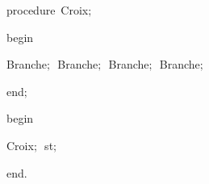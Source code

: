 {\pagebreak[3] 
\vspace{\neglskip}\mbox{\blc  \blk\idt  \mcl procedure\idt \ Croix$;$}\par 
\vspace{\neglskip}\mbox{\blc  \blk\idt  \mcl begin\idt }\par 
\vspace{\neglskip}\mbox{\blc  \blk\blk\idt  Branche$;$\ Branche$;$\ Branche$;$\ Branche$;$\ }\par 
\vspace{\neglskip}\mbox{\blc  \blk\idt  \mcl end\idt $;$}\par 
\medskip

\vspace{\neglskip}\mbox{\blc  \idt  \mcl begin\idt }\par 
\vspace{\neglskip}\mbox{\blc  \blk\idt  Croix$;$\ st$;$\ }\par 
\vspace{\neglskip}\mbox{\blc  \idt  \mcl end\idt $.$}\par 

\medskip }

